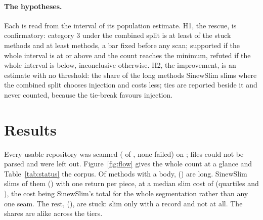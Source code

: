 \documentclass[11pt,a4paper]{article}
\newcommand{\Hone}{H1}
\newcommand{\Htwo}{H2}
\begin{document}
\paragraph{The hypotheses.} Each is read from the \planLevel{} interval of
its population estimate. \Hone{}, the rescue, is confirmatory: category 3
under the combined split is at least \planHOneShare{} of the stuck methods
and at least \planHOneMinimum{} methods, a bar fixed before any scan;
supported if the whole interval is at or above \planHOneShare{} and the count
reaches the minimum, refuted if the whole interval is below, inconclusive
otherwise. \Htwo{}, the improvement, is an estimate with no threshold: the
share of the long methods SinewSlim slims where the combined split chooses
injection and costs less; ties are reported beside it and never counted,
because the tie-break favours injection.

\section{Results}\label{sec:results}

Every usable repository was scanned (\nScanned{} of \nUsable{}, none
failed) on \scanDate{}; \nUnparsed{} files could not be parsed and were left
out. Figure~\ref{fig:flow} gives the whole count at a glance and
Table~\ref{tab:status} the corpus. Of \nMethods{} methods with a body,
\nLong{} (\longShare{}) are long. SinewSlim slims \nSlims{} of them
(\slimsShare{}) with one return per piece, at a median slim cost of
\slimCostMedian{} (quartiles \slimCostQone{} and \slimCostQthree{}), the
cost being SinewSlim's total for the whole segmentation rather than any one
seam. The rest, \nStuck{} (\stuckShare{}), are stuck: \nRecord{} slim only
with a record and \nNotSlimmable{} not at all. The shares are alike across
the tiers.
\end{document}
